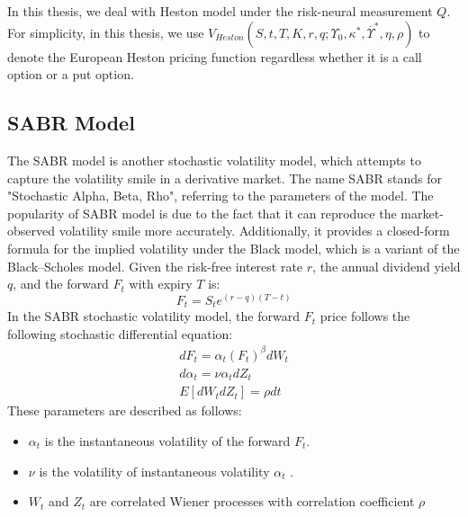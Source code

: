 \documentclass[letterpaper,12pt,titlepage,oneside,final]{book}
\numberwithin{equation}{section}
\theoremstyle{definition}
\begin{document}
In this thesis, we deal with Heston model under the risk-neural measurement $Q$. For simplicity, in this thesis,  we use $V_{Heston}(S,t,T,K,r,q;\Upsilon_0,\kappa^*,\overline{\Upsilon}^*,\eta,\rho)$ to denote the European Heston pricing function regardless  whether it is a call option or a put option.
\subsection{SABR Model}
\label{sec:SABR}
The SABR model  \cite{hagan2002managing} is another stochastic volatility model, which attempts to capture the volatility smile in a derivative market. The name SABR stands for "Stochastic Alpha, Beta, Rho", referring to the parameters of the model.  The popularity of SABR model is due to the fact that it can reproduce the market-observed volatility smile more accurately. Additionally,  it provides a closed-form
formula for the implied volatility under the Black model, which is a variant of the Black–Scholes model. 
Given the risk-free interest rate $r$, the annual dividend yield $q$, and the forward $F_t$ with expiry $T$ is: 
\[
F_t=S_t e^{(r-q) (T-t)}
\]
In the SABR stochastic volatility model, the  forward $F_t$ price follows the following stochastic differential equation:
\[
\begin{split}
dF_t=\alpha_t (F_t)^{\beta}dW_t\\
d\alpha_t=\mathbb{\nu} \alpha_t dZ_t\\
E[dW_tdZ_t]=\rho dt
\end{split}
\]
These parameters are described as follows:
\begin{itemize}
	\item $\alpha_t$ is the instantaneous  volatility of the forward $F_t$.
	\item $\nu$ is the   volatility of  instantaneous  volatility $\alpha_t$  .
	\item $W_t$ and $Z_t$ are correlated Wiener processes with correlation coefficient $\rho$
\end{itemize}
\end{document}
